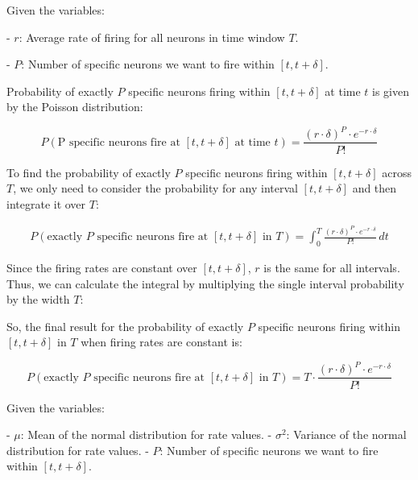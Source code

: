 Given the variables:


- \( r \): Average rate of firing for all neurons in time window \( T \).

- \( P \): Number of specific neurons we want to fire within \([t, t + \delta]\).

Probability of exactly \( P \) specific neurons firing within \([t, t + \delta]\) at time \( t \) is given by the Poisson distribution:

\begin{equation}
P(\text{P specific neurons fire at } [t, t + \delta] \text{ at time } t) = \frac{{(r \cdot \delta)^P \cdot e^{-r \cdot \delta}}}{{P!}}
\end{equation}

To find the probability of exactly \( P \) specific neurons firing within \([t, t + \delta]\) across \( T \), we only need to consider the probability for any interval \([t, t + \delta]\) and then integrate it over \( T \):

\begin{equation}
\begin{aligned}
    P(\text{exactly } P \text{ specific neurons fire at } [t, t + \delta] \text{ in } T) =    \int_{0}^{T} \frac{{(r \cdot \delta)^P \cdot e^{-r \cdot \delta}}}{{P!}} \, dt
\end{aligned}
\end{equation}

Since the firing rates are constant over \([t, t + \delta]\), \( r \) is the same for all intervals. Thus, we can calculate the integral by multiplying the single interval probability by the width \( T \):

So, the final result for the probability of exactly \( P \) specific neurons firing within \([t, t + \delta]\) in \( T \) when firing rates are constant is:

\begin{equation}
P(\text{exactly } P \text{ specific neurons fire at } [t, t + \delta] \text{ in } T) = T \cdot \frac{{(r \cdot \delta)^P \cdot e^{-r \cdot \delta}}}{{P!}}
\end{equation}


Given the variables:

- \( \mu \): Mean of the normal distribution for rate values.
- \( \sigma^2 \): Variance of the normal distribution for rate values.
- \( P \): Number of specific neurons we want to fire within \([t, t + \delta]\).

